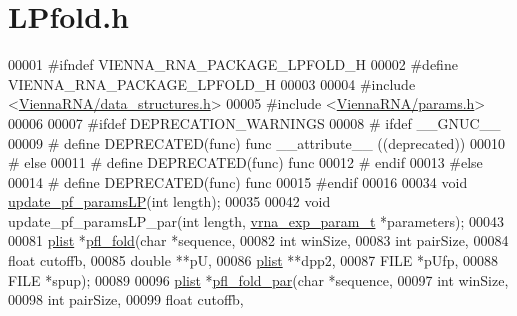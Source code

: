 \hypertarget{LPfold_8h_source}{\section{L\+Pfold.\+h}
\label{LPfold_8h_source}
}

\begin{DoxyCode}
00001 \textcolor{preprocessor}{#ifndef VIENNA\_RNA\_PACKAGE\_LPFOLD\_H}
00002 \textcolor{preprocessor}{#define VIENNA\_RNA\_PACKAGE\_LPFOLD\_H}
00003 
00004 \textcolor{preprocessor}{#include <\hyperlink{data__structures_8h}{ViennaRNA/data\_structures.h}>}
00005 \textcolor{preprocessor}{#include <\hyperlink{params_8h}{ViennaRNA/params.h}>}
00006 
00007 \textcolor{preprocessor}{#ifdef DEPRECATION\_WARNINGS}
00008 \textcolor{preprocessor}{# ifdef \_\_GNUC\_\_}
00009 \textcolor{preprocessor}{#  define DEPRECATED(func) func \_\_attribute\_\_ ((deprecated))}
00010 \textcolor{preprocessor}{# else}
00011 \textcolor{preprocessor}{#  define DEPRECATED(func) func}
00012 \textcolor{preprocessor}{# endif}
00013 \textcolor{preprocessor}{#else}
00014 \textcolor{preprocessor}{# define DEPRECATED(func) func}
00015 \textcolor{preprocessor}{#endif}
00016 
00034 \textcolor{keywordtype}{void} \hyperlink{group__local__pf__fold_ga5a019014d37fe6105131dfc2fc447880}{update\_pf\_paramsLP}(\textcolor{keywordtype}{int} length);
00035 
00042 \textcolor{keywordtype}{void} update\_pf\_paramsLP\_par(\textcolor{keywordtype}{int} length, \hyperlink{group__energy__parameters_structvrna__exp__param__s}{vrna\_exp\_param\_t} *parameters);
00043 
00081 \hyperlink{group__data__structures_structvrna__plist__s}{plist} *\hyperlink{group__local__pf__fold_ga7dcf599d07258801ea55e7d14a56908d}{pfl\_fold}(\textcolor{keywordtype}{char} *sequence,
00082                 \textcolor{keywordtype}{int} winSize,
00083                 \textcolor{keywordtype}{int} pairSize,
00084                 \textcolor{keywordtype}{float} cutoffb,
00085                 \textcolor{keywordtype}{double} **pU,
00086                 \hyperlink{group__data__structures_structvrna__plist__s}{plist} **dpp2,
00087                 FILE *pUfp,
00088                 FILE *spup);
00089 
00096 \hyperlink{group__data__structures_structvrna__plist__s}{plist} *\hyperlink{group__local__pf__fold_ga14c2b82fdd5ab7a1951f1c2db4f5cf2c}{pfl\_fold\_par}(\textcolor{keywordtype}{char} *sequence,
00097                     \textcolor{keywordtype}{int} winSize,
00098                     \textcolor{keywordtype}{int} pairSize,
00099                     \textcolor{keywordtype}{float} cutoffb,

\end{DoxyCode}
